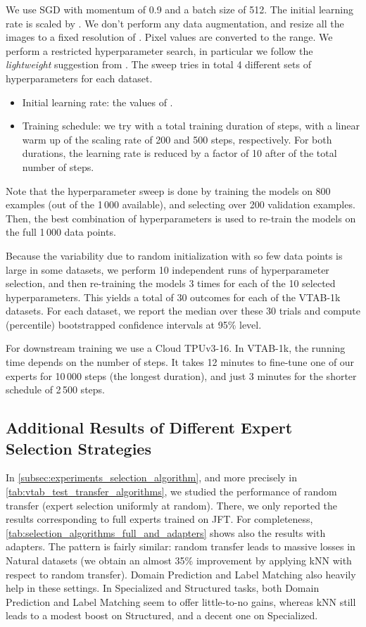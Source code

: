 \documentclass{article}
\begin{document}
We use SGD with momentum of 0.9 and a batch size of 512. 
The initial learning rate is scaled by . 
We don't perform any data augmentation, and resize all the images
to a fixed resolution of .
Pixel values are converted to the  range.
We perform a restricted hyperparameter search, in particular 
we follow the \emph{lightweight} suggestion from \cite{zhai2019visual}.
The sweep tries in total 4 different sets of hyperparameters for
each dataset.
\begin{itemize}
\item Initial learning rate: the values of .
\item Training schedule: we try with a total training duration
of  steps, with a linear warm up of the scaling
rate of 200 and 500 steps, respectively.
For both durations, the learning rate is reduced by a factor of 10 
after  of the
total number of steps.
\end{itemize}

Note that the hyperparameter sweep is done by training the models 
on 800 examples (out of the 1\,000 available), 
and selecting over 200 validation examples.
Then, the best combination of hyperparameters is used to re-train 
the models on the full 1\,000 data points.

Because the variability due to random initialization with so few 
data points is large in some datasets, we perform 10 independent 
runs of hyperparameter selection, and then re-training the models 
3 times for each of the 10 selected hyperparameters. 
This yields a total of 30 outcomes for each of the VTAB-1k datasets.
For each dataset, we report the median over these 30 trials and 
compute (percentile) bootstrapped confidence intervals at 95\% level.

For downstream training we use a Cloud TPUv3-16. In VTAB-1k, the running time 
depends on the number of steps. It takes 12 minutes to fine-tune one of our 
experts for 10\,000 steps (the longest duration), and just 3 minutes for the 
shorter schedule of 2\,500 steps.

\subsection{Additional Results of Different Expert Selection Strategies}
\label{subsec:results_selection_strategies_extra}

In \cref{subsec:experiments_selection_algorithm}, and more precisely in \cref{tab:vtab_test_transfer_algorithms}, we studied the performance of random transfer (expert selection uniformly at random).
There, we only reported the results corresponding to full experts trained on JFT.
For completeness, \cref{tab:selection_algorithms_full_and_adapters} shows also the results with adapters.
The pattern is fairly similar: random transfer leads to massive losses in Natural datasets (we obtain an almost 35\% improvement by applying kNN with respect to random transfer).
Domain Prediction and Label Matching also heavily help in these settings.
In Specialized and Structured tasks, both Domain Prediction and Label Matching seem to offer little-to-no gains, whereas kNN still leads to a modest boost on Structured, and a decent one on Specialized.
\end{document}
